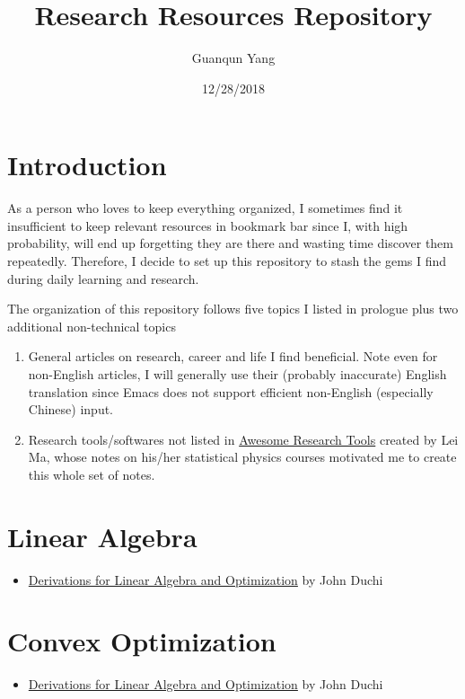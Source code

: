\documentclass[11pt]{article}
\author{Guanqun Yang}
\date{12/28/2018}
\title{Research Resources Repository}
\begin{document}
\maketitle
\tableofcontents


\section{Introduction}
\label{sec-1}
As a person who loves to keep everything organized, I sometimes find it insufficient
to keep relevant resources in bookmark bar since I, with high probability, will end up
forgetting they are there and wasting time discover them repeatedly. Therefore, I decide
to set up this repository to stash the gems I find during daily learning and research.

The organization of this repository follows five topics I listed in prologue plus two 
additional non-technical topics
\begin{enumerate}
\item General articles on research, career and life I find beneficial. Note even for non-English
articles, I will generally use their (probably inaccurate) English translation since Emacs does not
support efficient non-English (especially Chinese) input.
\item Research tools/softwares not listed in \href{https://github.com/emptymalei/awesome-research}{Awesome Research Tools} created by Lei Ma, whose
notes on his/her statistical physics courses motivated me to create this whole set of notes.
\end{enumerate}

\section{Linear Algebra}
\label{sec-2}

\begin{itemize}
\item \href{http://web.stanford.edu/~jduchi/projects/general_notes.pdf}{Derivations for Linear Algebra and Optimization} by John Duchi
\end{itemize}
\section{Convex Optimization}
\label{sec-3}

\begin{itemize}
\item \href{http://web.stanford.edu/~jduchi/projects/general_notes.pdf}{Derivations for Linear Algebra and Optimization} by John Duchi
\end{itemize}
\end{document}
